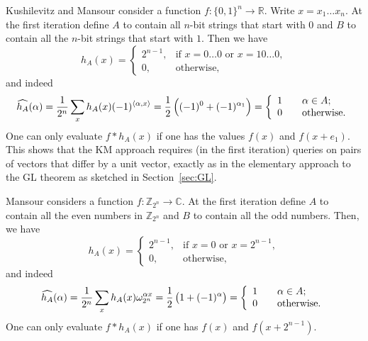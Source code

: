 \documentclass[11pt]{article}
\theoremstyle{definition}
\newcommand{\Z}{\mathbb{Z}}
\newcommand{\R}{\mathbb{R}}
\newcommand{\C}{\mathbb{C}}
\begin{document}
Kushilevitz and Mansour \cite{KM} consider a function $f: \{0,1\}^n \to \R$. Write $x = x_1 \ldots x_n$. At the first iteration define $A$ to contain all $n$-bit strings that start with $0$ and $B$ to contain all the $n$-bit strings that start with $1$. Then we have
\begin{equation}\label{eq_KM}
    h_A(x) = \begin{cases} 2^{n-1}, & \text{if }x = 0\ldots0 \text{ or } x=10\ldots0, \\ 0, &\text{otherwise,}\end{cases}
\end{equation}
and indeed
\[\widehat{h_A}(\alpha) = \frac{1}{2^n}\sum_x h_A(x) (-1)^{\langle \alpha, x \rangle} = \frac{1}{2} \left( (-1)^0 + (-1)^{\alpha_1} \right) = \left\{
    \begin{array}{l l}
        1 & \quad \alpha \in A;       \\
        0 & \quad \mathrm{otherwise.}
    \end{array}
    \right.\]
One can only evaluate $f \ast h_A(x)$ if one has the values $f(x)$ and $f(x+e_1)$.
This shows that the KM approach requires (in the first iteration) queries on pairs of vectors that differ by a unit vector, exactly as in the elementary approach to the GL theorem as sketched in Section~\ref{sec:GL}.

Mansour \cite{Mansour92} considers a function $f: \Z_{2^n} \to \C$. At the first iteration define $A$ to contain all the even numbers in $\Z_{2^n}$ and $B$ to contain all the odd numbers. Then, we have
\begin{equation}\label{eq_Mansour}
    h_A(x) = \begin{cases} 2^{n-1}, & \text{if }x = 0 \text{ or } x=2^{n-1}, \\ 0, &\text{otherwise,}\end{cases}
\end{equation}
and indeed
\[\widehat{h_A}(\alpha) = \frac{1}{2^n}\sum_x h_A(x) \omega_{2^n}^{\alpha x} = \frac{1}{2} \left( 1 + (-1)^{\alpha} \right) = \left\{
    \begin{array}{l l}
        1 & \quad \alpha \in A;       \\
        0 & \quad \mathrm{otherwise.}
    \end{array}
    \right.\]
One can only evaluate $f \ast h_A(x)$ if one has $f(x)$ and $f(x+2^{n-1})$.
\end{document}
